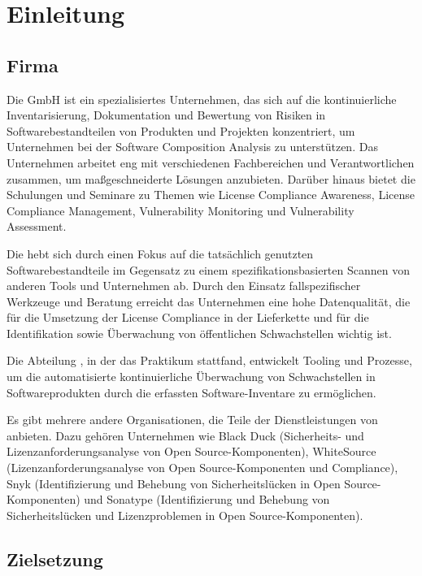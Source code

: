 

\chapter{Einleitung} \label{ch:einleitung}


\section{Firma} \label{sec:firma-beschreibung}

Die {\metaeffekt} GmbH ist ein spezialisiertes Unternehmen, das sich auf die kontinuierliche Inventarisierung, Dokumentation und Bewertung von Risiken in Softwarebestandteilen von Produkten und Projekten konzentriert, um Unternehmen bei der Software Composition Analysis zu unterstützen.
Das Unternehmen arbeitet eng mit verschiedenen Fachbereichen und Verantwortlichen zusammen, um maßgeschneiderte Lösungen anzubieten.
Darüber hinaus bietet die {\metaeffekt} Schulungen und Seminare zu Themen wie License Compliance Awareness, License Compliance Management, Vulnerability Monitoring und Vulnerability Assessment.

Die {\metaeffekt} hebt sich durch einen Fokus auf die tatsächlich genutzten Softwarebestandteile im Gegensatz zu einem spezifikationsbasierten Scannen von anderen Tools und Unternehmen ab.
Durch den Einsatz fallspezifischer Werkzeuge und Beratung erreicht das Unternehmen eine hohe Datenqualität, die für die Umsetzung der License Compliance in der Lieferkette und für die Identifikation sowie Überwachung von öffentlichen Schwachstellen wichtig ist.

Die Abteilung , in der das Praktikum stattfand, entwickelt Tooling und Prozesse, um die automatisierte kontinuierliche Überwachung von Schwachstellen in Softwareprodukten durch die erfassten Software-Inventare zu ermöglichen.

Es gibt mehrere andere Organisationen, die Teile der Dienstleistungen von {\metaeffekt} anbieten.
Dazu gehören Unternehmen wie
Black Duck (Sicherheits- und Lizenzanforderungsanalyse von Open Source-Komponenten),
WhiteSource (Lizenzanforderungsanalyse von Open Source-Komponenten und Compliance),
Snyk (Identifizierung und Behebung von Sicherheitslücken in Open Source-Komponenten) und
Sonatype (Identifizierung und Behebung von Sicherheitslücken und Lizenzproblemen in Open Source-Komponenten).


\section{Zielsetzung} \label{sec:zielsetzung-des-praktikums}


